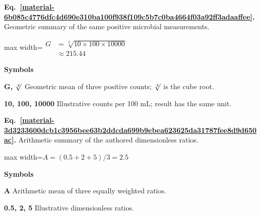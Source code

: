 \documentclass[11pt,a4paper]{article}
\begin{document}
\par\medskip
\begin{samepage}
\label{material-6b085c4776dfc4d690e310ba100f938f109c5b7c0ba4664f03a92ff3adaaffee}
\noindent\textbf{Eq.~\ref*{material-6b085c4776dfc4d690e310ba100f938f109c5b7c0ba4664f03a92ff3adaaffee}.} Geometric summary of the same positive microbial measurements.\par\nopagebreak
\begin{center}\begin{adjustbox}{max width=\linewidth}$\displaystyle \begin{aligned}G&=\sqrt[3]{10\times100\times10000}\\&\approx215.44\end{aligned}$\end{adjustbox}\end{center}

\par\noindent\textbf{Symbols}

\par\noindent\textbf{G, \ensuremath{\sqrt[3]{\vphantom{x}}}} Geometric mean of three positive counts; \ensuremath{\sqrt[3]{\vphantom{x}}} is the cube root.

\par\noindent\textbf{10, 100, 10000} Illustrative counts per 100 mL; result has the same unit.

\end{samepage}
\medskip

\par\medskip
\begin{samepage}
\label{material-3d3233600dcb1c3956bee63b2ddcda699b9ebea623625da31787fee8d9d650ac}
\noindent\textbf{Eq.~\ref*{material-3d3233600dcb1c3956bee63b2ddcda699b9ebea623625da31787fee8d9d650ac}.} Arithmetic summary of the authored dimensionless ratios.\par\nopagebreak
\begin{center}\begin{adjustbox}{max width=\linewidth}$\displaystyle A=(0.5+2+5)/3=2.5$\end{adjustbox}\end{center}

\par\noindent\textbf{Symbols}

\par\noindent\textbf{A} Arithmetic mean of three equally weighted ratios.

\par\noindent\textbf{0.5, 2, 5} Illustrative dimensionless ratios.

\end{samepage}
\medskip
\end{document}
